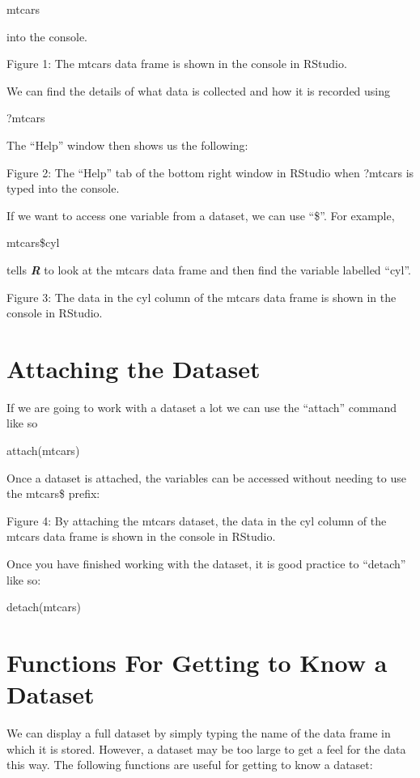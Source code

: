 \documentclass[
]{book}
\begin{document}
mtcars

into the console.

Figure 1: The mtcars data frame is shown in the console in RStudio.

We can find the details of what data is collected and how it is recorded using

?mtcars

The ``Help'' window then shows us the following:

Figure 2: The ``Help'' tab of the bottom right window in RStudio when ?mtcars is typed into the console.

If we want to access one variable from a dataset, we can use ``\$''. For example,

mtcars\$cyl

tells \textbf{\emph{R}} to look at the mtcars data frame and then find the variable labelled ``cyl''.

Figure 3: The data in the cyl column of the mtcars data frame is shown in the console in RStudio.

\section{Attaching the Dataset}\label{attaching-the-dataset}

If we are going to work with a dataset a lot we can use the ``attach'' command like so

attach(mtcars)

Once a dataset is attached, the variables can be accessed without needing to use the mtcars\$ prefix:

Figure 4: By attaching the mtcars dataset, the data in the cyl column of the mtcars data frame is shown in the console in RStudio.

Once you have finished working with the dataset, it is good practice to ``detach'' like so:

detach(mtcars)

\section{Functions For Getting to Know a Dataset}\label{functions-for-getting-to-know-a-dataset}

We can display a full dataset by simply typing the name of the data frame in which it is stored. However, a dataset may be too large to get a feel for the data this way. The following functions are useful for getting to know a dataset:
\end{document}
